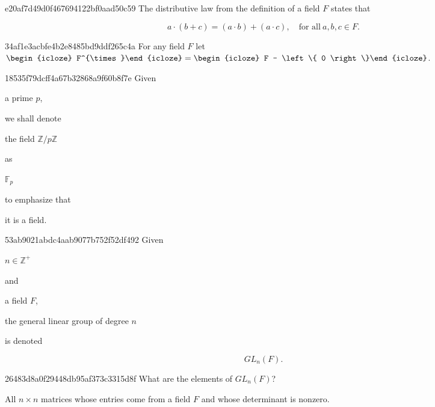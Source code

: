 \begin{note}{e20af7d49d0f467694122bf0aad50c59}
    The distributive law from the definition of a field \({ F }\) states that
    \begin{icloze}{1}
        \[
            a \cdot (b + c) = (a \cdot b) + (a \cdot c), \quad \text{for all}\ a, b, c \in F.
        \]
    \end{icloze}
\end{note}

\begin{note}{34af1e3acbfe4b2e8485bd9ddf265c4a}
    For any field \({ F }\) let \({ \begin{icloze}{2}F^{\times}\end{icloze} = \begin{icloze}{1}F - \left\{ 0 \right\}\end{icloze} }\).
\end{note}

\begin{note}{18535f79dcff4a67b32868a9f60b8f7e}
    Given \begin{icloze}{3}a prime \({ p }\),\end{icloze} we shall denote \begin{icloze}{1}the field \({ \mathbb Z / p\mathbb Z }\)\end{icloze} as \begin{icloze}{2}\({ \mathbb F_{p} }\)\end{icloze} to emphasize that \begin{icloze}{4}it is a field.\end{icloze}
\end{note}

\begin{note}{53ab9021abdc4aab9077b752f52df492}
    Given \begin{icloze}{3}\({ n \in \mathbb Z^{+} }\)\end{icloze} and \begin{icloze}{4}a field \({ F }\),\end{icloze} \begin{icloze}{1}the general linear group of degree \({ n }\)\end{icloze} is denoted
    \begin{icloze}{2}
        \[
            GL_n(F).
        \]
    \end{icloze}
\end{note}

\begin{note}{26483d8a0f29448db95af373c3315d8f}
    What are the elements of \({ GL_n(F) }\)?

    \begin{cloze}{1}
        All \({ n \times n }\) matrices whose entries come from a field \({ F }\) and whose determinant is nonzero.
    \end{cloze}
\end{note}

